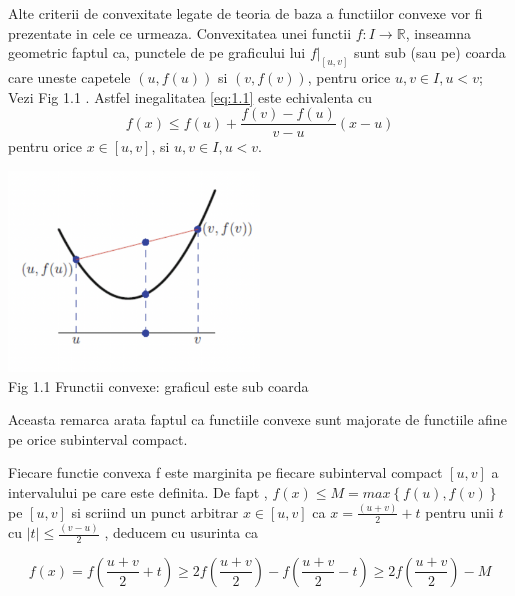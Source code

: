\documentclass[a4paper,12pt,oneside]{report}
\begin{document}
Alte criterii de convexitate legate de teoria de baza a functiilor convexe vor fi prezentate in cele ce urmeaza. 
Convexitatea unei functii \(f : I\rightarrow \mathbb{R}\), inseamna geometric faptul ca, punctele de pe graficului lui  \(f|_{\left [ u,v \right ]}\) sunt sub (sau pe) coarda care uneste capetele \(\left ( u , f {\left ( u \right )} \right )\)  si \(\left ( v , f {\left ( v \right )} \right )\), pentru orice \(u, v \in I, u < v\); 
Vezi Fig 1.1 . Astfel inegalitatea \ref{eq:1.1} este echivalenta cu 
\begin{displaymath}
  f\left ( x \right )\leq f\left ( u \right ) +\frac{f\left ( v \right )- f\left ( u \right )}{v - u}\left ( x - u \right ) \label{eq:1.2} \tag{1.2}
\end{displaymath}
pentru orice \(x\in \left [  u, v\right ]\), si \(u, v \in I, u < v\). 

\begin{center}
	\includegraphics[width=0.5\textwidth]{fig1.1.png}
	\\ Fig 1.1 Frunctii convexe: graficul este sub coarda
\end{center}

Aceasta remarca arata faptul ca functiile convexe sunt majorate de functiile afine pe orice subinterval compact. 

Fiecare functie convexa f este marginita pe fiecare subinterval compact \(\left [ u , v \right ]\) a intervalului pe care este definita. De fapt , \(f\left ( x \right ) \leq  M = max \left \{ f\left ( u \right ), f\left ( v \right ) \right \}\)  pe \(\left [ u , v \right ]\)  si scriind un punct arbitrar \(x\in  \left [ u , v  \right ]\)  ca  \(x= \frac{\left ( u + v \right )}{2} + t\) pentru unii \(t\) cu \(\left | t \right |\leq \frac{\left ( v - u \right )}{2}\) , deducem cu usurinta ca 

\begin{displaymath}
  f\left ( x \right )=  f\left ( \frac{u+v}{2} + t\right )\geq 2 f\left ( \frac{u + v}{2} \right )- f\left ( \frac{u + v}{2} - t\right )\geq 2f\left ( \frac{u+v}{2} \right ) - M
\end{displaymath}
\end{document}
